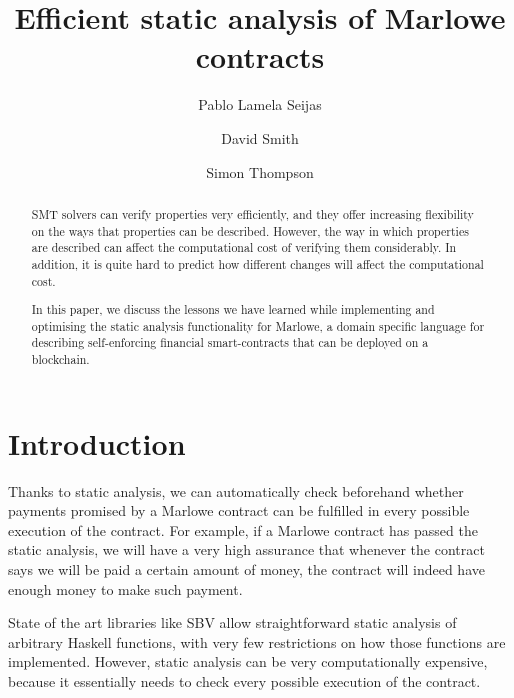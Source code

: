 \documentclass[english,runningheads]{llncs}
\begin{document}
\title{Efficient static analysis of Marlowe contracts}

\author{Pablo {Lamela Seijas} \and
        David Smith \and
        Simon Thompson}



\maketitle
\begin{abstract}
SMT solvers can verify properties very efficiently, and they offer increasing flexibility on the ways that properties can be described. However, the way in which properties are described can affect the computational cost of verifying them considerably. In addition, it is quite hard to predict how different changes will affect the computational cost.

In this paper, we discuss the lessons we have learned while implementing and optimising the static analysis functionality for Marlowe, a domain specific language for describing self-enforcing financial smart-contracts that can be deployed on a blockchain.
\end{abstract}
\section{Introduction\label{sec:Introduction}}

Thanks to static analysis, we can automatically check beforehand whether
payments promised by a Marlowe contract can be fulfilled in every
possible execution of the contract. For example, if a Marlowe contract
has passed the static analysis, we will have a very high assurance
that whenever the contract says we will be paid a certain amount of
money, the contract will indeed have enough money to make such payment.

State of the art libraries like SBV \cite{erkok2019sbv} allow straightforward
static analysis of arbitrary Haskell functions, with very few restrictions
on how those functions are implemented. However, static analysis can be very
computationally expensive, because it essentially needs to check every
possible execution of the contract.
\end{document}
